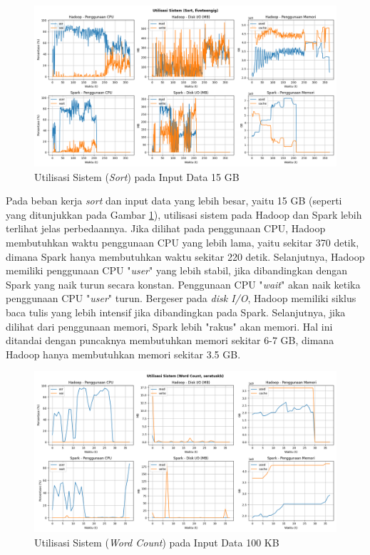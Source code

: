 \begin{figure}[h]
    \centering
    \includegraphics[width=1\textwidth]{figures/ch04/5-util-sistem-sort-fiveteengig}
    \caption{Utilisasi Sistem (\textit{Sort}) pada Input Data 15 GB}
    \label{fig:5-util-sistem-sort-fiveteengig}
\end{figure}

Pada beban kerja \textit{sort} dan input data yang lebih besar, yaitu 15 GB (seperti yang ditunjukkan pada Gambar \ref{fig:5-util-sistem-sort-fiveteengig}), utilisasi sistem pada Hadoop dan Spark lebih terlihat jelas perbedaannya. Jika dilihat pada penggunaan CPU, Hadoop membutuhkan waktu penggunaan CPU yang lebih lama, yaitu sekitar 370 detik, dimana Spark hanya membutuhkan waktu sekitar 220 detik. Selanjutnya, Hadoop memiliki penggunaan CPU "\textit{user}" yang lebih stabil, jika dibandingkan dengan Spark yang naik turun secara konstan. Penggunaan CPU "\textit{wait}" akan naik ketika penggunaan CPU "\textit{user}" turun. Bergeser pada \textit{disk I/O}, Hadoop memiliki siklus baca tulis yang lebih intensif jika dibandingkan pada Spark. Selanjutnya, jika dilihat dari penggunaan memori, Spark lebih "rakus" akan memori. Hal ini ditandai dengan puncaknya membutuhkan memori sekitar 6-7 GB, dimana Hadoop hanya membutuhkan memori sekitar 3.5 GB.

\begin{figure}[h]
    \centering
    \includegraphics[width=1\textwidth]{figures/ch04/5-util-sistem-wordcount-seratuskb}
    \caption{Utilisasi Sistem (\textit{Word Count}) pada Input Data 100 KB}
    \label{fig:5-util-sistem-wordcount-seratuskb}
\end{figure}

